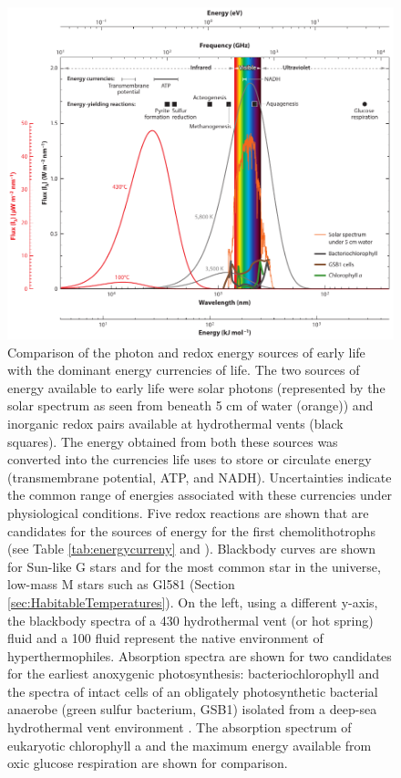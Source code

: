 \begin{figure}[!hbt]
	\centering
	\includegraphics[width=0.9\linewidth]{figures/AnnRevs/AR7.pdf}
	\caption[Energy sources and currencies of life]{Comparison of the photon and redox energy sources of early life with the dominant energy currencies of life. The two sources of energy available to early life were solar photons (represented by the solar spectrum as seen from beneath 5 cm of water (orange)) and inorganic redox pairs available at hydrothermal vents (black squares). The energy obtained from both these sources was converted into the currencies life uses to store or circulate energy (transmembrane potential, ATP, and NADH). Uncertainties indicate the common range of energies associated with these currencies under physiological conditions. Five redox reactions are shown that are candidates for the sources of energy for the first chemolithotrophs (see Table \ref{tab:energycurreny} and \citet{Blank2009}). Blackbody curves are shown for Sun-like G stars and for the most common star in the universe, low-mass M stars such as Gl581 (Section \ref{sec:HabitableTemperatures}). On the left, using a different y-axis, the blackbody spectra of a 430\textcelsius{} hydrothermal vent (or hot spring) fluid and a 100\textcelsius{} fluid represent the native environment of hyperthermophiles. Absorption spectra are shown for two candidates for the earliest anoxygenic photosynthesis: bacteriochlorophyll \citep{Frigaard1996,Madigan2006} and the spectra of intact cells of an obligately photosynthetic bacterial anaerobe (green sulfur bacterium, GSB1) isolated from a deep-sea hydrothermal vent environment \citep{Beatty2005}. The absorption spectrum of eukaryotic chlorophyll a \citep{Cinque2000} and the maximum energy available from oxic glucose respiration are shown for comparison.}
	\label{fig:AR7}
\end{figure}

